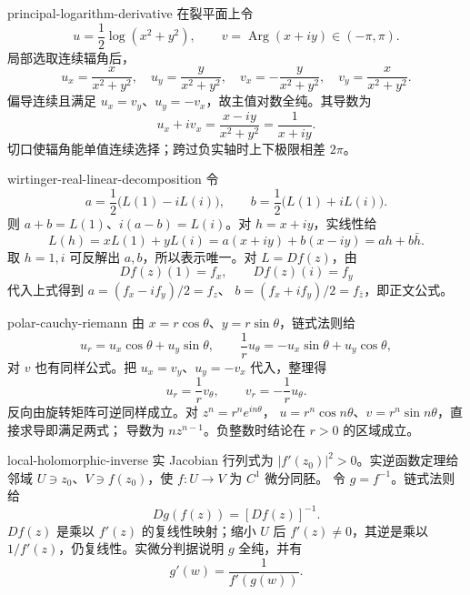 \begin{solution}{principal-logarithm-derivative}
在裂平面上令
\[
 u=\frac12\log(x^2+y^2),\qquad
 v=\operatorname{Arg}(x+iy)\in(-\pi,\pi).
\]
局部选取连续辐角后，
\[
 u_x=\frac{x}{x^2+y^2},\quad u_y=\frac{y}{x^2+y^2},\quad
 v_x=-\frac{y}{x^2+y^2},\quad v_y=\frac{x}{x^2+y^2}.
\]
偏导连续且满足 \(u_x=v_y\)、\(u_y=-v_x\)，故主值对数全纯。其导数为
\[
 u_x+iv_x=\frac{x-iy}{x^2+y^2}=\frac1{x+iy}.
\]
切口使辐角能单值连续选择；跨过负实轴时上下极限相差 \(2\pi\)。
\end{solution}

\begin{solution}{wirtinger-real-linear-decomposition}
令
\[
 a=\frac12\bigl(L(1)-iL(i)\bigr),\qquad
 b=\frac12\bigl(L(1)+iL(i)\bigr).
\]
则 \(a+b=L(1)\)、\(i(a-b)=L(i)\)。对 \(h=x+iy\)，实线性给
\[
 L(h)=xL(1)+yL(i)=a(x+iy)+b(x-iy)=ah+b\bar h.
\]
取 \(h=1,i\) 可反解出 \(a,b\)，所以表示唯一。对 \(L=Df(z)\)，由
\[
 Df(z)(1)=f_x,\qquad Df(z)(i)=f_y
\]
代入上式得到 \(a=(f_x-if_y)/2=f_z\)、
\(b=(f_x+if_y)/2=f_{\bar z}\)，即正文公式。
\end{solution}

\begin{solution}{polar-cauchy-riemann}
由 \(x=r\cos\theta\)、\(y=r\sin\theta\)，链式法则给
\[
 u_r=u_x\cos\theta+u_y\sin\theta,\qquad
 \frac1r u_\theta=-u_x\sin\theta+u_y\cos\theta,
\]
对 \(v\) 也有同样公式。把 \(u_x=v_y\)、\(u_y=-v_x\) 代入，整理得
\[
 u_r=\frac1r v_\theta,\qquad v_r=-\frac1r u_\theta.
\]
反向由旋转矩阵可逆同样成立。对 \(z^n=r^ne^{in\theta}\)，
\(u=r^n\cos n\theta\)、\(v=r^n\sin n\theta\)，直接求导即满足两式；
导数为 \(nz^{n-1}\)。负整数时结论在 \(r>0\) 的区域成立。
\end{solution}

\begin{solution}{local-holomorphic-inverse}
实 Jacobian 行列式为 \(|f'(z_0)|^2>0\)。实逆函数定理给邻域
\(U\ni z_0\)、\(V\ni f(z_0)\)，使 \(f:U\to V\) 为 \(C^1\) 微分同胚。
令 \(g=f^{-1}\)。链式法则给
\[
 Dg(f(z))=[Df(z)]^{-1}.
\]
\(Df(z)\) 是乘以 \(f'(z)\) 的复线性映射；缩小 \(U\) 后
\(f'(z)\ne0\)，其逆是乘以 \(1/f'(z)\)，仍复线性。实微分判据说明
\(g\) 全纯，并有
\[
 g'(w)=\frac1{f'(g(w))}.
\]
\end{solution}
